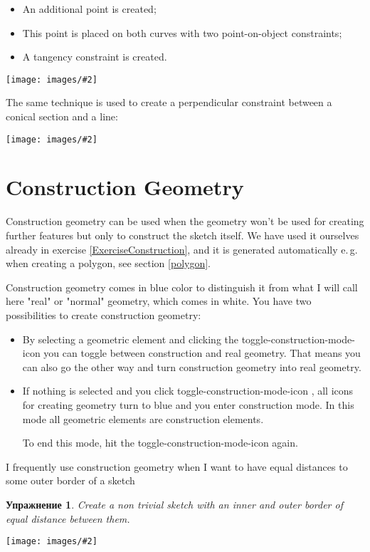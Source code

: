 \documentclass[12pt,titlepage]{article}
\newcommand{\icon}[1]{\raisebox{-1em}{\rule{0pt}{27pt}\texttt{[image: images/\#1]}}}
\newcommand{\img}[2]{\vspace{2ex}\noindent\texttt{[image: images/\#2]}}
\newtheorem{Exercise}{Упражнение}
\begin{document}
\begin{itemize}
\item An additional point is created;
\item This point is placed on both curves with two point-on-object constraints;
\item A tangency constraint is created.
\end{itemize}

\img{scale=1}{ConicalTangent}

The same technique is used to create a perpendicular constraint between a conical section and a line:

\img{scale=1}{ConicalPerpendicular}

\section{Construction Geometry}
\label{ConstructionGeometry}
\vbox{
Construction geometry can be used when the geometry won't be used for creating further features but only to construct the sketch itself. We have used it ourselves already in exercise \vref{ExerciseConstruction}, and it is generated automatically e.\,g. when creating a polygon, see section \vref{polygon}.
}

Construction geometry comes in blue color to distinguish it from what I will call here "real" or "normal" geometry, which comes in white. You have two possibilities to create construction geometry:
\begin{itemize}
\item By selecting a geometric element and clicking the toggle-construction-mode-icon       \icon{Sketcher_AlterConstruction} you can toggle between construction and real       geometry. That means you can also go the other way and turn construction       geometry into real geometry.
\item If nothing is selected and you click toggle-construction-mode-icon       \icon{Sketcher_AlterConstruction}, all icons for creating geometry turn to blue       and you enter construction mode. In this mode all geometric elements are       construction elements.

      To end this mode, hit the toggle-construction-mode-icon again.      
\end{itemize}


I frequently use construction geometry when I want to have equal distances to some
outer border of a sketch

\begin{Exercise}
Create a non trivial sketch with an inner and outer border of equal distance between them.
\end{Exercise}
\hspace{\leftmargin}\img{width=0.78\textwidth}{ConstructionReady}
\end{document}
